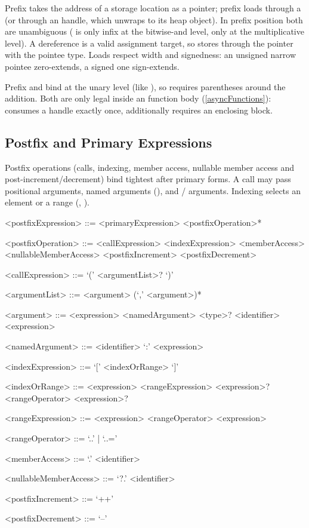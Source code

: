 \documentclass[makeidx]{article}
\begin{document}
\LMHash{}%
Prefix  takes the address of a storage location as a
 pointer; prefix  loads through a  (or
through an  handle, which unwraps to its heap object).
In prefix position both are unambiguous (\code{\&} is only infix at
the bitwise-and level, \code{*} only at the multiplicative level).
A dereference is a valid assignment target, so  stores
through the pointer with the pointee type. Loads respect width and
signedness: an unsigned narrow pointee zero-extends, a signed one
sign-extends.

\LMHash{}%
Prefix  and  bind at the unary level (like
), so  requires parentheses around the
addition. Both are only legal inside an  function body
(\ref{asyncFunctions}):  consumes a  handle
exactly once,  additionally requires an enclosing
 block.

\subsection{Postfix and Primary Expressions}

\LMHash{}%
Postfix operations (calls, indexing, member access, nullable member
access and post-increment/decrement) bind tightest after primary
forms. A call may pass positional arguments, named arguments
(), and / arguments.
Indexing selects an element or a range (, ).

\begin{grammar}
<postfixExpression> ::= <primaryExpression> <postfixOperation>*

<postfixOperation> ::= <callExpression>
  \alt <indexExpression>
  \alt <memberAccess>
  \alt <nullableMemberAccess>
  \alt <postfixIncrement>
  \alt <postfixDecrement>

<callExpression> ::= `(' <argumentList>? `)'

<argumentList> ::= <argument> (`,' <argument>)*

<argument> ::= <expression>
  \alt <namedArgument>
  \alt \OUT{} <type>? <identifier>
  \alt \REF{} <expression>

<namedArgument> ::= <identifier> `:' <expression>

<indexExpression> ::= `[' <indexOrRange> `]'

<indexOrRange> ::= <expression>
  \alt <rangeExpression>
  \alt <expression>? <rangeOperator> <expression>?

<rangeExpression> ::= <expression> <rangeOperator> <expression>

<rangeOperator> ::= `..' | `..='

<memberAccess> ::= `.' <identifier>

<nullableMemberAccess> ::= `?.' <identifier>

<postfixIncrement> ::= `++'

<postfixDecrement> ::= `--'
\end{grammar}
\end{document}
